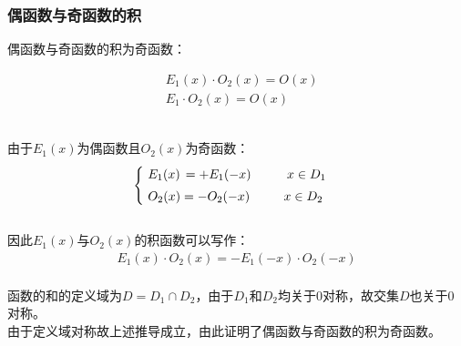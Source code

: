 \documentclass[UTF8]{ctexart}
\begin{document}
\subsubsection{偶函数与奇函数的积}
    \setcounter{equation}{0}
    偶函数与奇函数的积为奇函数：
    \begin{large}
        \begin{align*}
            &E_1(x)\cdot O_2(x)=O(x)\\[3mm]
            &E_1\cdot O_2(x)=O(x)
        \end{align*}
    \end{large}\\
    由于$E_1(x)$为偶函数且$O_2(x)$为奇函数：
    \begin{align}
        \begin{cases}
            ~E_1(x)\hspace{1.5pt}=+E_1(-x)\hspace{1.5pt}~~~~~~~~x\in D_1\\[1mm]
            ~O_2(x)=-O_2(-x)~~~~~~~~x\in D_2
        \end{cases}
    \end{align}\\
    因此$E_1(x)$与$O_2(x)$的积函数可以写作：
    \begin{align}
        E_1(x)\cdot O_2(x)=-E_1(-x)\cdot O_2(-x)
    \end{align}\\
    函数的和的定义域为$D=D_1\cap D_2$，由于$D_1$和$D_2$均关于$0$对称，故交集$D$也关于$0$对称。\\[3mm]
    由于定义域对称故上述推导成立，由此证明了偶函数与奇函数的积为奇函数。\vspace{8pt}
    
\newpage
\end{document}
